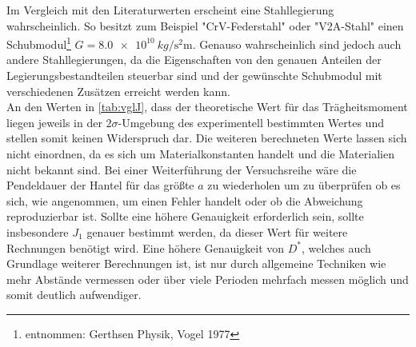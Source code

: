 Im Vergleich mit den Literaturwerten erscheint eine Stahllegierung wahrscheinlich. So besitzt zum Beispiel "CrV-Federstahl" oder "V2A-Stahl" einen Schubmodul\footnote{entnommen: Gerthsen Physik, Vogel 1977} $G=\SI{8.0 e10}{kg \per  \second \squared \metre}$.
Genauso wahrscheinlich sind jedoch auch andere Stahllegierungen, da die Eigenschaften von den genauen Anteilen der Legierungsbestandteilen steuerbar sind und der gewünschte Schubmodul mit verschiedenen Zusätzen erreicht werden kann.\\
An den Werten in \cref{tab:vglJ}, dass der theoretische Wert für das Trägheitsmoment liegen jeweils in der $2 \sigma$-Umgebung des experimentell bestimmten Wertes und stellen somit keinen Widerspruch dar. Die weiteren berechneten Werte lassen sich nicht einordnen, da es sich um Materialkonstanten handelt und die Materialien nicht bekannt sind. Bei einer Weiterführung der Versuchsreihe wäre die Pendeldauer der Hantel für das größte $a$ zu wiederholen um zu überprüfen ob es sich, wie angenommen, um einen Fehler handelt oder ob die Abweichung reproduzierbar ist. Sollte eine höhere Genauigkeit erforderlich sein, sollte insbesondere $J_1$ genauer bestimmt werden, da dieser Wert für weitere Rechnungen benötigt wird. Eine höhere Genauigkeit von $D^*$, welches auch Grundlage weiterer Berechnungen ist, ist nur durch allgemeine Techniken wie mehr Abstände vermessen oder über viele Perioden mehrfach messen möglich und somit deutlich aufwendiger. 













